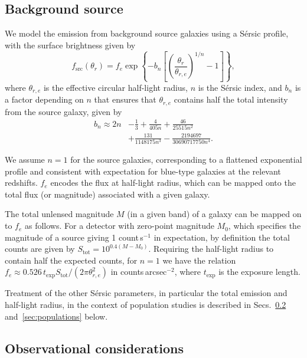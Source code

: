\documentclass[twocolumn]{aastex62}
\begin{document}
\subsection{Background source}

We model the emission from background source galaxies using a S\'{e}rsic profile, with the surface brightness given by
\begin{equation}
f_\mathrm{src}(\theta_r)=f_{e} \exp \left\{-b_{n}\left[\left(\frac{\theta_r}{\theta_{r,e}}\right)^{1 / n}-1\right]\right\},
\end{equation}
where $\theta_{r,e}$ is the effective circular half-light radius, $n$ is the S\'{e}rsic index, and $b_n$ is a factor depending on $n$ that ensures that $\theta_{r,e}$ contains half the total intensity from the source galaxy, given by~\citep{1999A&A...352..447C}
\begin{align}
b_n \approx 2 n &- \frac{1}{3} + \frac{4}{405 n} + \frac{46}{25515 n^2} \nonumber \\ &+ \frac{131}{1148175 n^3} - \frac{2194697}{30690717750 n^4}. \nonumber
\end{align}

We assume $n=1$ for the source galaxies, corresponding to a flattened exponential profile and consistent with expectation for blue-type galaxies at the relevant redshifts. $f_{e}$ encodes the flux at half-light radius, which can be mapped onto the total flux (or magnitude) associated with a given galaxy.

The total unlensed magnitude $M$ (in a given band) of a galaxy can be mapped on to $f_{e}$ as follows. For a detector with zero-point magnitude $M_0$, which specifies the magnitude of a source giving 1 count\,s$^{-1}$ in expectation, by definition the total counts are given by $S_\mathrm{tot}=10^{0.4(M-M_0)}$. Requiring the half-light radius to contain half the expected counts, for $n=1$ we have the relation $f_{e} \approx 0.526\,t_\mathrm{exp}S_\mathrm{tot} /(2\pi \theta_{r,e}^2)$ in counts\,arcsec$^{-2}$, where $t_\mathrm{exp}$ is the exposure length.

Treatment of the other S\'{e}rsic parameters, in particular the total emission and half-light radius, in the context of population studies is described in Secs.~\ref{sec:observations} and~\ref{sec:populations} below.

\subsection{Observational considerations}
\label{sec:observations}
\end{document}
